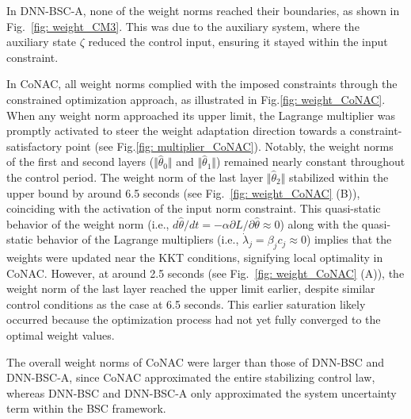 \documentclass[lettersize,journal]{IEEEtran}
\begin{document}
In DNN-BSC-A, none of the weight norms reached their boundaries, as shown in Fig.~\ref{fig: weight_CM3}. This was due to the auxiliary system, where the auxiliary state $\zeta$ reduced the control input, ensuring it stayed within the input constraint.

In CoNAC, all weight norms complied with the imposed constraints through the constrained optimization approach, as illustrated in Fig.\ref{fig: weight_CoNAC}. When any weight norm approached its upper limit, the Lagrange multiplier was promptly activated to steer the weight adaptation direction towards a constraint-satisfactory point (see Fig.\ref{fig: multiplier_CoNAC}). Notably, the weight norms of the first and second layers ($\Vert {{{\hat \theta }_0}} \Vert$ and $\Vert {{{\hat \theta }_1}} \Vert$) remained nearly constant throughout the control period. The weight norm of the last layer $\Vert {{{\hat \theta }_2}} \Vert$ stabilized within the upper bound by around 6.5 seconds (see Fig.~\ref{fig: weight_CoNAC} (B)), coinciding with the activation of the input norm constraint. This quasi-static behavior of the weight norm (i.e., $d{\hat\theta}/dt=-\alpha\partial L/\partial \hat\theta \approx 0$) along with the quasi-static behavior of the Lagrange multipliers (i.e., $\dot\lambda_j = \beta_j c_j \approx 0$) implies that the weights were updated near the KKT conditions, signifying local optimality in CoNAC. However, at around 2.5 seconds (see Fig.~\ref{fig: weight_CoNAC} (A)), the weight norm of the last layer reached the upper limit earlier, despite similar control conditions as the case at 6.5 seconds. This earlier saturation likely occurred because the optimization process had not yet fully converged to the optimal weight values.

The overall weight norms of CoNAC were larger than those of DNN-BSC and DNN-BSC-A, since CoNAC approximated the entire stabilizing control law, whereas DNN-BSC and DNN-BSC-A only approximated the system uncertainty term within the BSC framework.


\end{document}

